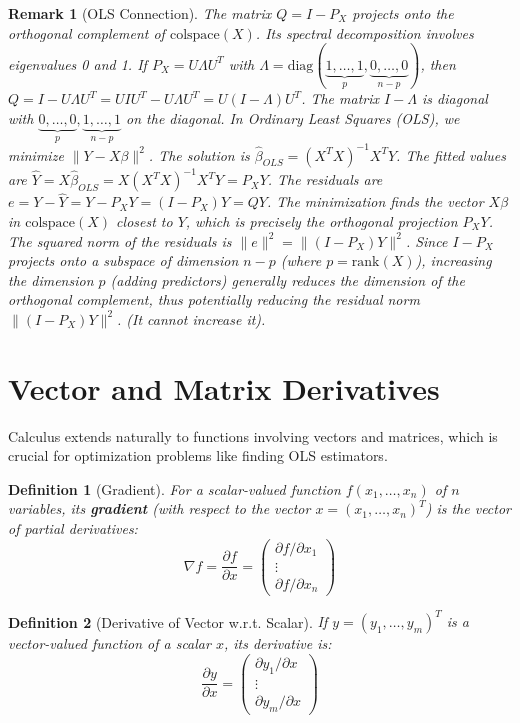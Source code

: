 \documentclass[11pt, a4paper]{article}
\theoremstyle{mydefinitionstyle}
\newtheorem{definition}{Definition}[section]
\newtheorem{remark}{Remark}[section]
\theoremstyle{mytheoremstyle}
\newcommand{\colspace}{\text{colspace}}
\newcommand{\rank}{\text{rank}}
\begin{document}
\begin{remark}[OLS Connection] \label{rem:ols}
    The matrix $Q = I - P_X$ projects onto the orthogonal complement of $\colspace(X)$. Its spectral decomposition involves eigenvalues 0 and 1. If $P_X = U \Lambda U^T$ with $\Lambda = \text{diag}(\underbrace{1, \dots, 1}_{p}, \underbrace{0, \dots, 0}_{n-p})$, then $Q = I - U \Lambda U^T = U I U^T - U \Lambda U^T = U(I - \Lambda)U^T$. The matrix $I - \Lambda$ is diagonal with $\underbrace{0, \dots, 0}_{p}, \underbrace{1, \dots, 1}_{n-p}$ on the diagonal.
    In Ordinary Least Squares (OLS), we minimize $\| Y - X\beta \|^2$. The solution is $\hat{\beta}_{OLS} = (X^T X)^{-1} X^T Y$. The fitted values are $\hat{Y} = X\hat{\beta}_{OLS} = X(X^T X)^{-1} X^T Y = P_X Y$. The residuals are $e = Y - \hat{Y} = Y - P_X Y = (I - P_X)Y = QY$. The minimization finds the vector $X\beta$ in $\colspace(X)$ closest to $Y$, which is precisely the orthogonal projection $P_X Y$. The squared norm of the residuals is $\|e\|^2 = \|(I-P_X)Y\|^2$. Since $I-P_X$ projects onto a subspace of dimension $n-p$ (where $p=\rank(X)$), increasing the dimension $p$ (adding predictors) generally reduces the dimension of the orthogonal complement, thus potentially reducing the residual norm $\|(I-P_X)Y\|^2$. (It cannot increase it).
\end{remark}

\section{Vector and Matrix Derivatives}

Calculus extends naturally to functions involving vectors and matrices, which is crucial for optimization problems like finding OLS estimators.

\begin{definition}[Gradient] \label{def:gradient}
    For a scalar-valued function $f(x_1, \dots, x_n)$ of $n$ variables, its \textbf{gradient} (with respect to the vector $x = (x_1, \dots, x_n)^T$) is the vector of partial derivatives:
    \[ \nabla f = \frac{\partial f}{\partial x} = \begin{pmatrix} \partial f / \partial x_1 \\ \vdots \\ \partial f / \partial x_n \end{pmatrix} \]
\end{definition}

\begin{definition}[Derivative of Vector w.r.t. Scalar] \label{def:vec_scalar_deriv}
    If $y = (y_1, \dots, y_m)^T$ is a vector-valued function of a scalar $x$, its derivative is:
    \[ \frac{\partial y}{\partial x} = \begin{pmatrix} \partial y_1 / \partial x \\ \vdots \\ \partial y_m / \partial x \end{pmatrix} \]
\end{definition}
\end{document}

